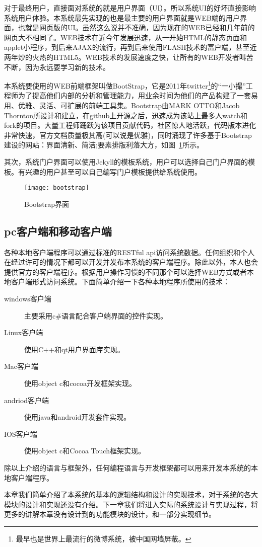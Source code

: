 对于最终用户，直接面对系统的就是用户界面（UI）。所以系统UI的好坏直接影响系统用户体验。本系统最先实现的也是最主要的用户界面就是WEB端的用户界面，也就是网页版的UI。虽然这么说并不准确，因为现在的WEB已经和几年前的网页大不相同了。WEB技术在近今年发展迅速，从一开始HTML的静态页面和applet小程序，到后来AJAX的流行，再到后来使用FLASH技术的富户端，甚至近两年炒的火热的HTML5。WEB技术的发展速度之快，让所有的WEB开发者叫苦不断，因为永远要学习新的技术。

本系统要使用的WEB前端框架叫做BootStrap，它是2011年twitter\footnote{最早也是世界上最流行的微博系统，被中国网墙屏蔽。}的“一小撮”工程师为了提高他们内部的分析和管理能力，用业余时间为他们的产品构建了一套易用、优雅、灵活、可扩展的前端工具集。Bootstrap由MARK OTTO和Jacob Thornton所设计和建立，在github上开源之后，迅速成为该站上最多人watch和fork的项目。大量工程师踊跃为该项目贡献代码，社区惊人地活跃，代码版本进化非常快速，官方文档质量极其高(可以说是优雅)，同时涌现了许多基于Bootstrap建设的网站：界面清新、简洁;要素排版利落大方，如图~\ref{fig:xfig14}所示。

其次，系统门户界面可以使用Jekyll的模板系统，用户可以选择自己门户界面的模板。有兴趣的用户甚至可以自己编写门户模板提供给系统使用。

\begin{figure}[H]
  \centering
  \texttt{[image: bootstrap]}
  \caption{Bootstrap界面}
  \label{fig:xfig14}
\end{figure}

\subsection{pc客户端和移动客户端}
\label{sec:pcandriodmac}

各种本地客户端程序可以通过标准的RESTful api访问系统数据。任何组织和个人在经过许可的情况下都可以开发并发布本系统的客户端程序。除此以外，本人也会提供官方的客户端程序。根据用户操作习惯的不同那个可以选择WEB方式或者本地客户端形式访问系统。下面简单介绍一下各种本地程序所使用的技术：
\begin{description}
\item[windows客户端] 主要采用c\#语言配合客户端界面的控件实现。
\item[Linux客户端] 使用C++和qt用户界面库实现。
\item[Mac客户端] 使用object c和cocoa开发框架实现。
\item[andriod客户端] 使用java和android开发套件实现。
\item[IOS客户端] 使用object c和Cocoa Touch框架实现。
\end{description}

除以上介绍的语言与框架外，任何编程语言与开发框架都可以用来开发本系统的本地客户端程序。

本章我们简单介绍了本系统的基本的逻辑结构和设计的实现技术，对于系统的各大模块的设计和实现还没有介绍。下一章我们将进入实际的系统设计与实现过程，将更多的讲解本章没有设计到的功能模块的设计，和一部分实现细节。